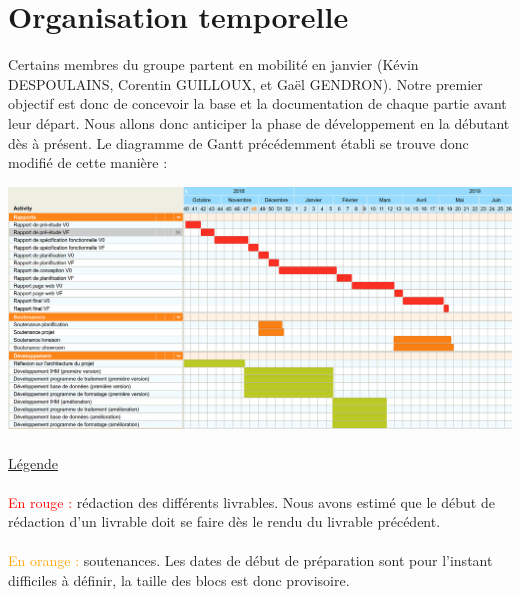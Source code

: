 \section{Organisation temporelle}

Certains membres du groupe partent en mobilité en janvier (Kévin DESPOULAINS,
Corentin GUILLOUX, et Gaël GENDRON). Notre premier objectif est donc de
concevoir la base et la documentation de chaque partie avant leur départ.
Nous allons donc anticiper la phase de développement en la débutant dès à
présent. Le diagramme de Gantt précédemment établi se trouve donc modifié de
cette manière :

\newpage

\begin{mdframed}[frametitle={Figure 17 : Estimation de la planification des tâches}, innerbottommargin=10]
\begin{center}
\includegraphics[scale=0.5]{gantt.png}
\end{center}
\end{mdframed}

\paragraph{}
\underline{Légende}

\paragraph{}
\textcolor{red}{En rouge : } rédaction des différents livrables. Nous avons estimé que le début de rédaction d’un livrable doit se faire dès le rendu du livrable précédent.

\paragraph{}
\textcolor{orange}{En orange : } soutenances. Les dates de début de préparation sont pour l’instant difficiles à définir, la taille des blocs est donc provisoire.


